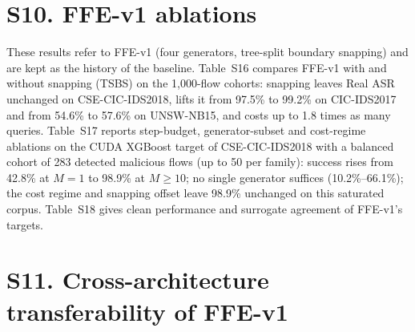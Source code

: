 \section*{S10. FFE-v1 ablations}

These results refer to FFE-v1 (four generators, tree-split boundary snapping) and are kept as the history of the baseline. Table~S16 compares FFE-v1 with and without snapping (TSBS) on the 1,000-flow cohorts: snapping leaves Real ASR unchanged on CSE-CIC-IDS2018, lifts it from 97.5\% to 99.2\% on CIC-IDS2017 and from 54.6\% to 57.6\% on UNSW-NB15, and costs up to 1.8 times as many queries. Table~S17 reports step-budget, generator-subset and cost-regime ablations on the CUDA XGBoost target of CSE-CIC-IDS2018 with a balanced cohort of 283 detected malicious flows (up to 50 per family): success rises from 42.8\% at $M=1$ to 98.9\% at $M\ge10$; no single generator suffices (10.2\%--66.1\%); the cost regime and snapping offset leave 98.9\% unchanged on this saturated corpus. Table~S18 gives clean performance and surrogate agreement of FFE-v1's targets.

\begin{table}[!htbp]
\centering
\caption*{Table S16. FFE-v1 with and without tree-split boundary snapping (XGBoost, Real ASR with Wilson 95\% interval).}
\footnotesize

\end{table}

\begin{table}[!htbp]
\centering
\caption*{Table S17. Ablation of FFE-v1 on CUDA XGBoost, CSE-CIC-IDS2018 ($N=283$). Delay is the mean added flow duration.}
\footnotesize
\resizebox{\columnwidth}{!}{%
%
}
\end{table}

\begin{table}[!htbp]
\centering
\caption*{Table S18. FFE-v1 against XGBoost and LightGBM: clean test performance, Real ASR on the 1,000-flow cohort (Wilson 95\% intervals) and surrogate--target agreement.}
\scriptsize
\resizebox{\columnwidth}{!}{%
%
}
\end{table}

\section*{S11. Cross-architecture transferability of FFE-v1}

